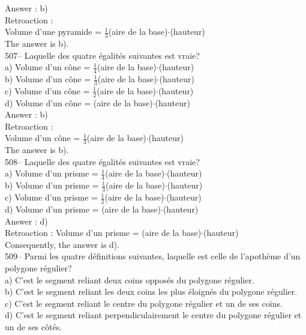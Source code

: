﻿\documentclass[letterpaper, 12pt]{article}
\begin{document}
Answer : b)\\

Retroaction :  \\
Volume d'une pyramide = $\frac{1}{3}$(aire de la base)$\cdot$(hauteur)\\
The answer is b).\\

507-- Laquelle des quatre \'egalit\'es suivantes est vraie?\\
a) Volume d'un c\^one = $\frac{1}{4}$(aire de la
base)$\cdot$(hauteur)\\[2mm]
b) Volume d'un c\^one = $\frac{1}{3}$(aire de la
base)$\cdot$(hauteur)\\[2mm]
c) Volume d'un c\^one = $\frac{1}{2}$(aire de la
base)$\cdot$(hauteur)\\[2mm]
d) Volume d'un c\^one = (aire de la base)$\cdot$(hauteur)\\

Answer : b)\\

Retroaction :  \\
Volume d'un c\^one = $\frac{1}{3}$(aire de la base)$\cdot$(hauteur)\\
The answer is b).\\

508-- Laquelle des quatre \'egalit\'es suivantes est vraie?\\
a) Volume d'un prisme = $\frac{1}{4}$(aire de la
base)$\cdot$(hauteur)\\[2mm]
b) Volume d'un prisme = $\frac{1}{3}$(aire de la
base)$\cdot$(hauteur)\\[2mm]
c) Volume d'un prisme = $\frac{1}{2}$(aire de la
base)$\cdot$(hauteur)\\[2mm]
d) Volume d'un prisme = (aire de la base)$\cdot$(hauteur)\\

Answer : d)\\

Retroaction :
Volume d'un prisme = (aire de la base)$\cdot$(hauteur)\\
Consequently, the answer is d).\\

509-- Parmi les quatre d\'efinitions suivantes, laquelle est celle de
l'apoth\`eme d'un polygone r\'egulier?\\
a) C'est le segment reliant deux coins oppos\'es du polygone r\'egulier.\\
b) C'est le segment reliant les deux coins les plus \'eloign\'es du polygone
r\'egulier.\\
c) C'est le segment reliant le centre du polygone r\'egulier et un de ses
coins.\\
d) C'est le segment reliant perpendiculairement le centre du polygone
r\'egulier et un de ses c\^ot\'es.\\
\end{document}
